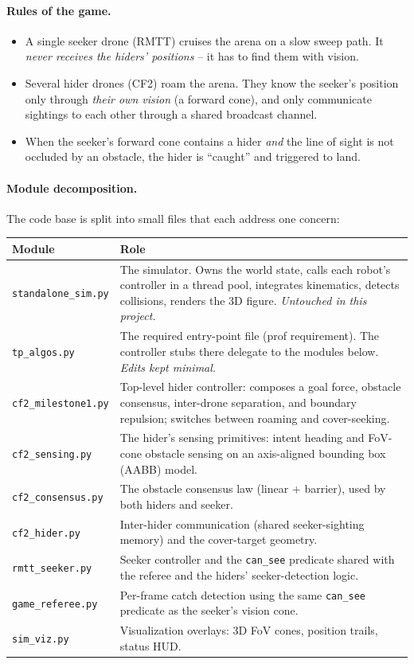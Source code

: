 \documentclass[11pt,a4paper]{article}
\newcommand{\code}[1]{\texttt{#1}}
\begin{document}
\paragraph{Rules of the game.}
\begin{itemize}[leftmargin=1.4em]
  \item A single seeker drone (RMTT) cruises the arena on a slow sweep path.
        It \emph{never receives the hiders' positions} -- it has to find them
        with vision.
  \item Several hider drones (CF2) roam the arena. They know the seeker's
        position only through \emph{their own vision} (a forward cone), and
        only communicate sightings to each other through a shared broadcast
        channel.
  \item When the seeker's forward cone contains a hider \emph{and} the line
        of sight is not occluded by an obstacle, the hider is ``caught'' and
        triggered to land.
\end{itemize}

\paragraph{Module decomposition.}
The code base is split into small files that each address one concern:

\begin{longtable}{p{4cm}p{10cm}}
\toprule
\textbf{Module} & \textbf{Role} \\
\midrule
\code{standalone\_sim.py} & The simulator. Owns the world state, calls each
robot's controller in a thread pool, integrates kinematics, detects
collisions, renders the 3D figure. \emph{Untouched in this project.} \\
\code{tp\_algos.py} & The required entry-point file (prof requirement). The
controller stubs there delegate to the modules below. \emph{Edits kept
minimal.} \\
\code{cf2\_milestone1.py} & Top-level hider controller: composes a goal force,
obstacle consensus, inter-drone separation, and boundary repulsion; switches
between roaming and cover-seeking. \\
\code{cf2\_sensing.py} & The hider's sensing primitives: intent heading and
FoV-cone obstacle sensing on an axis-aligned bounding box (AABB) model. \\
\code{cf2\_consensus.py} & The obstacle consensus law (linear + barrier),
used by both hiders and seeker. \\
\code{cf2\_hider.py} & Inter-hider communication (shared seeker-sighting
memory) and the cover-target geometry. \\
\code{rmtt\_seeker.py} & Seeker controller and the \code{can\_see} predicate
shared with the referee and the hiders' seeker-detection logic. \\
\code{game\_referee.py} & Per-frame catch detection using the same
\code{can\_see} predicate as the seeker's vision cone. \\
\code{sim\_viz.py} & Visualization overlays: 3D FoV cones, position trails,
status HUD. \\
\bottomrule
\end{longtable}
\end{document}
